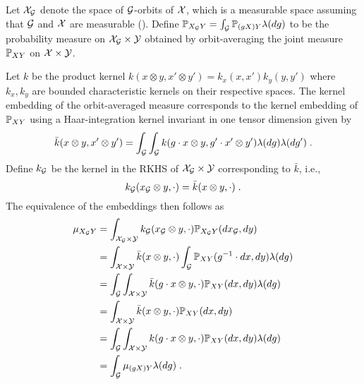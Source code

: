 \begin{itemize}
Let $\calX_\calG$ denote the space of $\calG$-orbits of $\calX$, which is a measurable space assuming that $\calG$ and $\calX$ are measurable (\todo). Define $\P_{X_\calG Y}=\int_{\calG}\bbP_{(gX)Y}\lambda(dg)$ to be the probability measure on $\calX_\calG\times\calY$ obtained by orbit-averaging the joint measure $\P_{XY}$ on $\calX\times\calY$.

Let $k$ be the product kernel $k(x\otimes y,x'\otimes y') = k_x(x,x')k_y(y,y')$ where $k_x,k_y$ are bounded characteristic kernels on their respective spaces. The kernel embedding of the orbit-averaged measure corresponds to the kernel embedding of $\P_{XY}$ using a Haar-integration kernel \parencite{Haasdonk:2005} invariant in one tensor dimension given by
\[
\bar{k}(x\otimes y,x'\otimes y')=\int_\calG\int_\calG k(g\cdot x\otimes y, g'\cdot x'\otimes y')\lambda(dg)\lambda(dg')\;.
\]
Define $k_\calG$ be the kernel in the RKHS of $\calX_\calG\times\calY$ corresponding to $\bar{k}$, i.e.,
\[
k_\calG(x_\calG\otimes y,\cdot) = \bar{k}(x\otimes y,\cdot)\;.
\]
The equivalence of the embeddings then follows as
\begin{align*}
\mu_{X_\calG Y} &= \int_{\calX_\calG\times\calY}k_\calG(x_\calG\otimes y,\cdot)\P_{X_\calG Y}(dx_\calG,dy) \\
&= \int_{\calX\times\calY}\bar{k}(x\otimes y,\cdot)\int_\calG\bbP_{XY}(g^{-1}\cdot dx,dy)\lambda(dg) \\
&= \int_\calG\int_{\calX\times\calY}\bar{k}(g\cdot x\otimes y,\cdot)\bbP_{XY}(dx,dy)\lambda(dg) \\
&= \int_{\calX\times\calY}\bar{k}(x\otimes y,\cdot)\bbP_{XY}(dx,dy) \\
&= \int_\calG\int_{\calX\times\calY}k(g\cdot x\otimes y,\cdot)\bbP_{XY}(dx,dy)\lambda(dg) \\
&= \int_\calG\mu_{(gX)Y}\lambda(dg) \;.
\end{align*}


\end{itemize}
